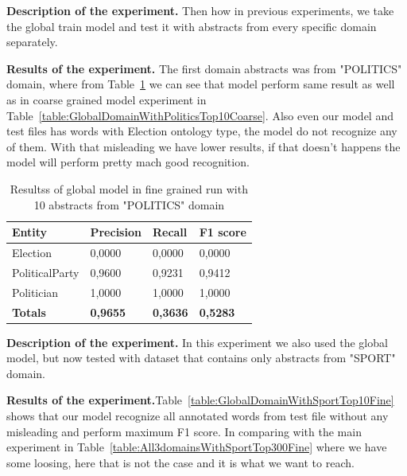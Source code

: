 \documentclass[thesis=M,english]{FITthesis}[2018/05/30]
\begin{document}
	\textbf{Description of the experiment.} Then how in previous experiments, we take the global train model and test it with abstracts from every specific domain separately. 
	
	\textbf{Results of the experiment.} The first domain abstracts was from "POLITICS" domain, where from Table~\ref{table:GlobalDomainWithPoliticsTop10Fine} we can see that model perform same result as well as in coarse grained model experiment in Table~\ref{table:GlobalDomainWithPoliticsTop10Coarse}. Also even our model and test files has words with Election ontology type, the model do not recognize any of them. With that misleading we have lower results, if that doesn't happens the model will perform pretty mach good recognition.
	
	\begin{table}[H]\centering
		\begin{tabular}{|l|l|l|l|}
			\hline {\textbf{Entity}} & {\textbf{Precision}} & {\textbf{Recall}} & {\textbf{F1 score}}\\\hline
				Election & 0,0000 & 0,0000 & 0,0000\\
				PoliticalParty & 0,9600 & 0,9231 & 0,9412\\
				Politician & 1,0000 & 1,0000 & 1,0000\\\hline
				\textbf{Totals} & \textbf{0,9655} & \textbf{0,3636} & \textbf{0,5283}\\\hline
		\end{tabular}
		\caption{Resultss of global model in fine grained run with 10 abstracts from "POLITICS" domain \label{table:GlobalDomainWithPoliticsTop10Fine}}		
	\end{table}	

	\textbf{Description of the experiment.} In this experiment we also used the global model, but now tested with dataset that contains only abstracts from "SPORT" domain. 
	
	\textbf{Results of the experiment.}Table~\ref{table:GlobalDomainWithSportTop10Fine} shows that our model recognize all annotated words from test file without any misleading and perform maximum F1 score. In comparing with the main experiment in Table~\ref{table:All3domainsWithSportTop300Fine} where we have some loosing, here that is not the case and it is what we want to reach.
	
\end{document}
